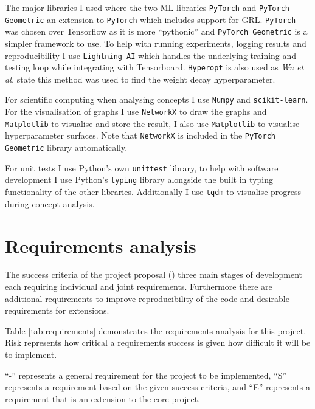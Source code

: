 The major libraries I used where the two ML libraries \texttt{PyTorch}  and \texttt{PyTorch Geometric} \cite{Fey/Lenssen/2019} an extension to \texttt{PyTorch} which includes support for GRL.
\texttt{PyTorch} was chosen over Tensorflow as it is more ``pythonic'' and \texttt{PyTorch Geometric} is a simpler framework to use.
To help with running experiments, logging results and reproducibility I use \texttt{Lightning AI} which handles the underlying training and testing loop while integrating with Tensorboard.
\texttt{Hyperopt} is also used as \textit{Wu et al.}\cite{wu2019simplifying} state this method was used to find the weight decay hyperparameter.

For scientific computing when analysing concepts I use \texttt{Numpy} and \texttt{scikit-learn}. For the visualisation of graphs I use \texttt{NetworkX} to draw the graphs and \texttt{Matplotlib} to visualise and store the result, I also use \texttt{Matplotlib} to visualise hyperparameter surfaces. Note that \texttt{NetworkX} is included in the \texttt{PyTorch Geometric} library automatically.

For unit tests I use Python's own \texttt{unittest} library, to help with software development I use Python's \texttt{typing} library alongside the built in typing functionality of the other libraries. Additionally I use \texttt{tqdm} to visualise progress during concept analysis.

\section{Requirements analysis}


The success criteria of the project proposal () three main stages of development each requiring individual and joint requirements.
Furthermore there are additional requirements to improve reproducibility of the code and desirable requirements for extensions.

Table \ref{tab:requirements} demonstrates the requirements analysis for this project.
Risk represents how critical a requirements success is given how difficult it will be to implement.

``-'' represents a general requirement for the project to be implemented, ``S'' represents a requirement based on the given success criteria, and ``E'' represents a requirement that is an extension to the core project.

